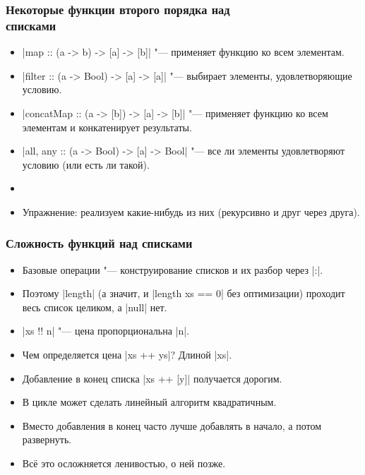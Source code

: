 \documentclass[11pt]{beamer}
\begin{document}
\begin{frame}[fragile]
  \frametitle{Некоторые функции второго порядка над\\ списками}
  \begin{itemize}
    \item \haskinline|map :: (a -> b) -> [a] -> [b]| \pause"--- применяет функцию ко всем элементам.
    \item \haskinline|filter :: (a -> Bool) -> [a] -> [a]| \pause"--- выбирает элементы, удовлетворяющие условию.
    \item \haskinline|concatMap :: (a -> [b]) -> [a] -> [b]| \pause"--- применяет функцию ко всем элементам и конкатенирует результаты.
    \item \haskinline|all, any :: (a -> Bool) -> [a] -> Bool| \pause"--- все ли элементы удовлетворяют условию (или есть ли такой).
          \pause
    \item[]
    \item Упражнение: реализуем какие-нибудь из них (рекурсивно и друг через друга).
  \end{itemize}
\end{frame}

\begin{frame}[fragile]
  \frametitle{Сложность функций над списками}
  \begin{itemize}
    \item Базовые операции "--- конструирование списков и их разбор через \haskinline|:|.
          \pause
    \item Поэтому \haskinline|length| (а значит, и \haskinline|length xs == 0| без оптимизации) проходит весь список целиком, а \haskinline|null| нет.
          \pause
    \item \haskinline[escapeinside=``]|xs !! n| "--- цена пропорциональна \pause\haskinline|n|.
          \pause
    \item Чем определяется цена \haskinline|xs ++ ys|? \pause Длиной \haskinline|xs|.
          \pause
    \item Добавление в конец списка \haskinline|xs ++ [y]| получается дорогим.
    \item В цикле может сделать линейный алгоритм квадратичным.
          \pause
    \item Вместо добавления в конец часто лучше добавлять в начало, а потом развернуть.
          \pause
    \item Всё это осложняется ленивостью, о ней позже.
  \end{itemize}
\end{frame}
\end{document}
